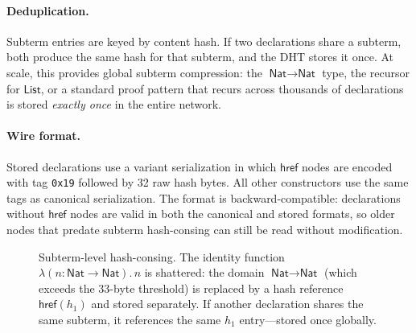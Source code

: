 \documentclass[11pt]{article}
\theoremstyle{definition}
\theoremstyle{plain}
\theoremstyle{remark}
\newcommand{\Nat}{\textsf{Nat}}
\newcommand{\bvar}{\textsf{bvar}}
\newcommand{\lam}{\textsf{lam}}
\newcommand{\forallE}{\textsf{forallE}}
\newcommand{\hrefE}{\textsf{href}}
\begin{document}
\paragraph{Deduplication.}
Subterm entries are keyed by content hash.
If two declarations share a subterm, both produce the same hash for that subterm,
and the DHT stores it once.
At scale, this provides global subterm compression: the $\Nat \to \Nat$ type, the
recursor for $\textsf{List}$, or a standard proof pattern that recurs across thousands
of declarations is stored \emph{exactly once} in the entire network.

\paragraph{Wire format.}
Stored declarations use a variant serialization in which $\hrefE$ nodes are encoded
with tag \texttt{0x19} followed by 32 raw hash bytes.
All other constructors use the same tags as canonical serialization.
The format is backward-compatible: declarations without $\hrefE$ nodes are valid
in both the canonical and stored formats, so older nodes that predate subterm
hash-consing can still be read without modification.

\begin{figure}[t]
\centering
{}
\caption{Subterm-level hash-consing.
  The identity function $\lambda(n{:}\Nat{\to}\Nat).\,n$ is shattered:
  the domain $\Nat \to \Nat$ (which exceeds the 33-byte threshold)
  is replaced by a hash reference $\hrefE(h_1)$ and stored separately.
  If another declaration shares the same subterm, it references the same $h_1$ entry---stored once globally.}
\label{fig:shatter}
\end{figure}
\end{document}
